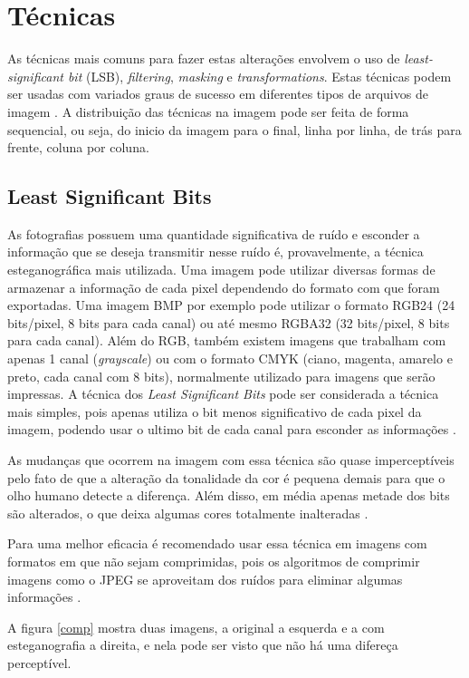 \documentclass[12pt]{article}
\begin{document}
\section{Técnicas}

As técnicas mais comuns para fazer estas alterações envolvem o uso de \textit{least-significant bit} (LSB), \textit{filtering}, \textit{masking} e \textit{transformations}. Estas técnicas podem ser usadas com variados graus de sucesso em diferentes tipos de arquivos de imagem \cite{methods}. A distribuição das técnicas na imagem pode ser feita de forma sequencial, ou seja, do inicio da imagem para o final, linha por linha, de trás para frente, coluna por coluna.  

\subsection{Least Significant Bits}

As fotografias possuem uma quantidade significativa de ruído e esconder a informação que se deseja transmitir nesse ruído é, provavelmente, a técnica esteganográfica mais utilizada. Uma imagem pode utilizar diversas formas de armazenar a informação de cada pixel dependendo do formato com que foram exportadas. Uma imagem BMP por exemplo pode utilizar o formato RGB24 (24 bits/pixel, 8 bits para cada canal) ou até mesmo RGBA32 (32 bits/pixel, 8 bits para cada canal). Além do RGB, também existem imagens que trabalham com apenas 1 canal (\textit{grayscale}) ou com o formato CMYK (ciano, magenta, amarelo e preto, cada canal com 8 bits), normalmente utilizado para imagens que serão impressas.
A técnica dos \textit{Least Significant Bits} pode ser considerada a técnica mais simples, pois apenas utiliza o bit menos significativo de cada pixel da imagem, podendo usar o ultimo bit de cada canal para esconder as informações \cite{methods}. 

As mudanças que ocorrem na imagem com essa técnica são quase imperceptíveis pelo fato de que a alteração da tonalidade da cor é pequena demais para que o olho humano detecte a diferença. Além disso, em média apenas metade dos bits são alterados, o que deixa algumas cores totalmente inalteradas \cite{methods}.

Para uma melhor eficacia é recomendado usar essa técnica em imagens com formatos em que não sejam comprimidas, pois os algoritmos de comprimir imagens como o JPEG se aproveitam dos ruídos para eliminar algumas informações \cite{methods, tecnica}.

A figura \ref{comp} mostra duas imagens, a original a esquerda e a com esteganografia a direita, e nela pode ser visto que não há uma difereça perceptível. 
\end{document}
